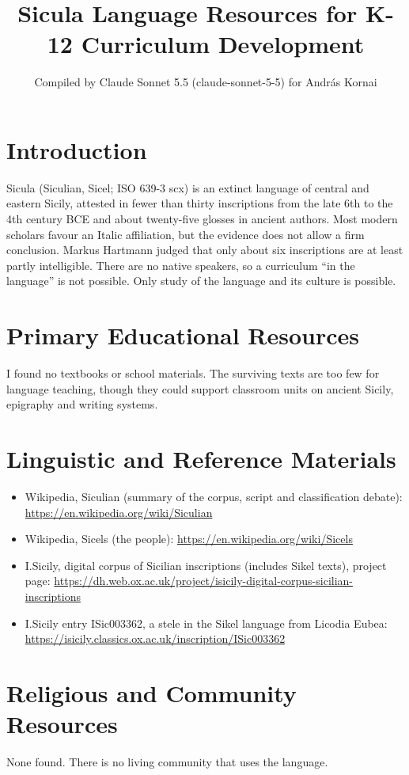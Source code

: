 \documentclass[12pt]{article}
\title{Sicula Language Resources for K-12 Curriculum Development}
\author{Compiled by Claude Sonnet 5.5 (claude-sonnet-5-5) for Andr\'as Kornai}
\date{}
\begin{document}
\maketitle

\section{Introduction}
Sicula (Siculian, Sicel; ISO 639-3 scx) is an extinct language of central and eastern Sicily, attested in fewer than thirty inscriptions from the late 6th to the 4th century BCE and about twenty-five glosses in ancient authors. Most modern scholars favour an Italic affiliation, but the evidence does not allow a firm conclusion. Markus Hartmann judged that only about six inscriptions are at least partly intelligible. There are no native speakers, so a curriculum ``in the language'' is not possible. Only study of the language and its culture is possible.

\section{Primary Educational Resources}
I found no textbooks or school materials. The surviving texts are too few for language teaching, though they could support classroom units on ancient Sicily, epigraphy and writing systems.

\section{Linguistic and Reference Materials}
\begin{itemize}
\item Wikipedia, Siculian (summary of the corpus, script and classification debate): \url{https://en.wikipedia.org/wiki/Siculian}
\item Wikipedia, Sicels (the people): \url{https://en.wikipedia.org/wiki/Sicels}
\item I.Sicily, digital corpus of Sicilian inscriptions (includes Sikel texts), project page: \url{https://dh.web.ox.ac.uk/project/isicily-digital-corpus-sicilian-inscriptions}
\item I.Sicily entry ISic003362, a stele in the Sikel language from Licodia Eubea: \url{https://isicily.classics.ox.ac.uk/inscription/ISic003362}
\end{itemize}

\section{Religious and Community Resources}
None found. There is no living community that uses the language.
\end{document}
